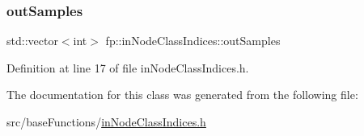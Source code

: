 \subsubsection{\texorpdfstring{out\+Samples}{outSamples}}
{\footnotesize\ttfamily std\+::vector$<$int$>$ fp\+::in\+Node\+Class\+Indices\+::out\+Samples\hspace{0.3cm}{\ttfamily [private]}}



Definition at line 17 of file in\+Node\+Class\+Indices.\+h.



The documentation for this class was generated from the following file\+:\begin{DoxyCompactItemize}
\item 
src/base\+Functions/\hyperlink{inNodeClassIndices_8h}{in\+Node\+Class\+Indices.\+h}\end{DoxyCompactItemize}
